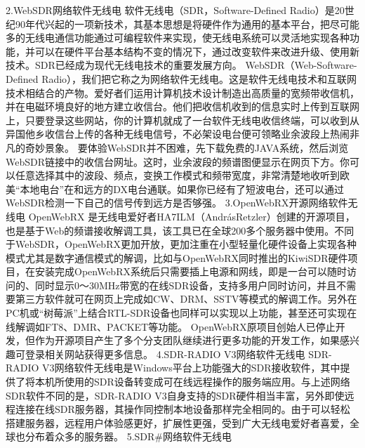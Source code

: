 \documentclass[12pt,UTF8]{ctexbook}
\begin{document}
2.WebSDR网络软件无线电
软件无线电（SDR，Software-Defined Radio）是20世纪90年代兴起的一项新技术，其基本思想是将硬件作为通用的基本平台，把尽可能多的无线电通信功能通过可编程软件来实现，使无线电系统可以灵活地实现各种功能，并可以在硬件平台基本结构不变的情况下，通过改变软件来改进升级、使用新技术。SDR已经成为现代无线电技术的重要发展方向。
WebSDR（Web-Software-Defined Radio），我们把它称之为网络软件无线电。这是软件无线电技术和互联网技术相结合的产物。爱好者们运用计算机技术设计制造出高质量的宽频带收信机，并在电磁环境良好的地方建立收信台。他们把收信机收到的信息实时上传到互联网上，只要登录这些网站，你的计算机就成了一台软件无线电收信终端，可以收到从异国他乡收信台上传的各种无线电信号，不必架设电台便可领略业余波段上热闹非凡的奇妙景象。
要体验WebSDR并不困难，先下载免费的JAVA系统，然后浏览WebSDR链接中的收信台网址。这时，业余波段的频谱图便显示在网页下方。你可以任意选择其中的波段、频点，变换工作模式和频带宽度，非常清楚地收听到欧美“本地电台”在和远方的DX电台通联。如果你已经有了短波电台，还可以通过WebSDR检测一下自己的信号传到远方是否够强。
3.OpenWebRX开源网络软件无线电
OpenWebRX 是无线电爱好者HA7ILM（AndrásRetzler）创建的开源项目，也是基于Web的频谱接收解调工具，该工具已在全球200多个服务器中使用。不同于WebSDR，OpenWebRX更加开放，更加注重在小型轻量化硬件设备上实现各种模式尤其是数字通信模式的解调，比如与OpenWebRX同时推出的KiwiSDR硬件项目，在安装完成OpenWebRX系统后只需要插上电源和网线，即是一台可以随时访问的、同时显示0～30MHz带宽的在线SDR设备，支持多用户同时访问，并且不需要第三方软件就可在网页上完成如CW、DRM、SSTV等模式的解调工作。另外在PC机或“树莓派”上结合RTL-SDR设备也同样可以实现以上功能，甚至还可实现在线解调如FT8、DMR、PACKET等功能。
OpenWebRX原项目创始人已停止开发，但作为开源项目产生了多个分支团队继续进行更多功能的开发工作，如果感兴趣可登录相关网站获得更多信息。
4.SDR-RADIO V3网络软件无线电
SDR-RADIO V3网络软件无线电是Windows平台上功能强大的SDR接收软件，其中提供了将本机所使用的SDR设备转变成可在线远程操作的服务端应用。与上述网络SDR软件不同的是，SDR-RADIO V3自身支持的SDR硬件相当丰富，另外即使远程连接在线SDR服务器，其操作同控制本地设备那样完全相同的。由于可以轻松搭建服务器，远程用户体验感更好，扩展性更强，受到广大无线电爱好者喜爱，全球也分布着众多的服务器。
5.SDR\#网络软件无线电
\end{document}
